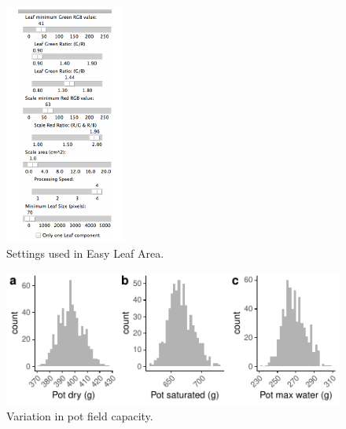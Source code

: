 \documentclass[jou,floatsintext]{apa6}
\begin{document}
\begin{figure}[!h]
\includegraphics[width=\textwidth]{../Figures/settings_used} \caption{Settings used in Easy Leaf Area.}\label{fig:leafarea}
\end{figure}



\begin{figure}[!h]
\includegraphics[width=\textwidth]{../Figures/pots} \caption{Variation in pot field capacity.}\label{fig:pots}
\end{figure}
\end{document}
